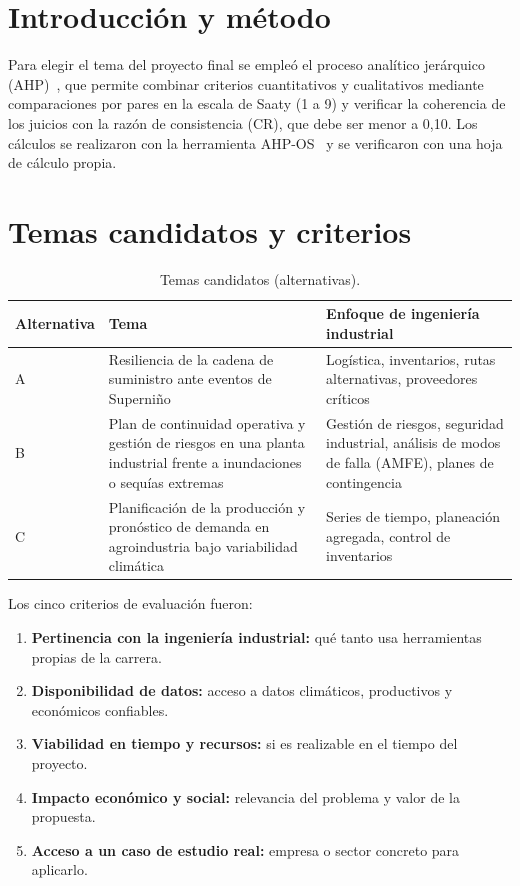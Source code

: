 \documentclass[runningheads]{llncs}
\begin{document}
\section{Introducción y método}
Para elegir el tema del proyecto final se empleó el proceso analítico jerárquico (AHP)~\cite{saaty1980}, que permite combinar criterios cuantitativos y cualitativos mediante comparaciones por pares en la escala de Saaty (1 a 9) y verificar la coherencia de los juicios con la razón de consistencia (CR), que debe ser menor a 0,10. Los cálculos se realizaron con la herramienta AHP-OS~\cite{goepel2018} y se verificaron con una hoja de cálculo propia.

\section{Temas candidatos y criterios}

\begin{table}[H]
\centering
\small
\caption{Temas candidatos (alternativas).}\label{tab:alternativas}
\begin{tabular}{|p{1.6cm}|p{5.2cm}|p{4.6cm}|}
\hline
Alternativa & Tema & Enfoque de ingeniería industrial\\
\hline
A & Resiliencia de la cadena de suministro ante eventos de Superniño & Logística, inventarios, rutas alternativas, proveedores críticos\\
\hline
B & Plan de continuidad operativa y gestión de riesgos en una planta industrial frente a inundaciones o sequías extremas & Gestión de riesgos, seguridad industrial, análisis de modos de falla (AMFE), planes de contingencia\\
\hline
C & Planificación de la producción y pronóstico de demanda en agroindustria bajo variabilidad climática & Series de tiempo, planeación agregada, control de inventarios\\
\hline
\end{tabular}
\end{table}

Los cinco criterios de evaluación fueron:
\begin{enumerate}
\item \textbf{Pertinencia con la ingeniería industrial:} qué tanto usa herramientas propias de la carrera.
\item \textbf{Disponibilidad de datos:} acceso a datos climáticos, productivos y económicos confiables.
\item \textbf{Viabilidad en tiempo y recursos:} si es realizable en el tiempo del proyecto.
\item \textbf{Impacto económico y social:} relevancia del problema y valor de la propuesta.
\item \textbf{Acceso a un caso de estudio real:} empresa o sector concreto para aplicarlo.
\end{enumerate}
\end{document}
